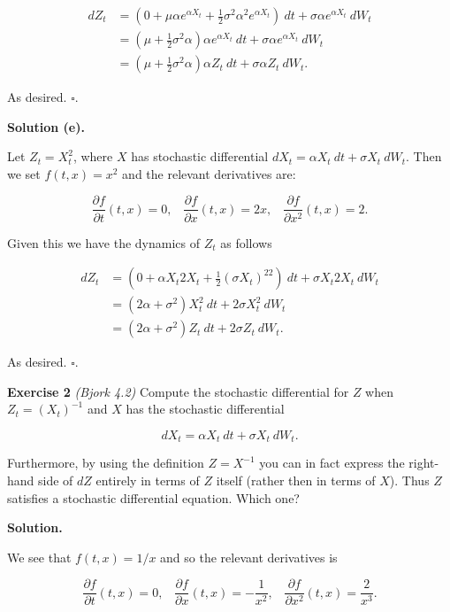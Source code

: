 \documentclass[
]{book}
\begin{document}
\begin{align*}
dZ_t&=\left(0+\mu \alpha e^{\alpha X_t}+\frac{1}{2} \sigma^2\alpha^2 e^{\alpha X_t}\right)\ dt+\sigma \alpha e^{\alpha X_t}\ dW_t\\
&=\left(\mu+\frac{1}{2}\sigma^2\alpha\right)\alpha e^{\alpha X_t}\ dt+\sigma \alpha e^{\alpha X_t}\ dW_t\\
&=\left(\mu+\frac{1}{2}\sigma^2\alpha\right)\alpha Z_t\ dt+\sigma \alpha Z_t\ dW_t.
\end{align*}

As desired. \(\square\).

\textbf{Solution (e).}

Let \(Z_t=X_t^2\), where \(X\) has stochastic differential \(dX_t=\alpha X_t\ dt+\sigma X_t\ dW_t\). Then we set \(f(t,x)=x^2\) and the relevant derivatives are:

\[
\frac{\partial f}{\partial t}(t,x)=0,\hspace{10pt}\frac{\partial f}{\partial x}(t,x) =2x,\hspace{10pt}\frac{\partial f}{\partial x^2}(t,x) =2.
\]

Given this we have the dynamics of \(Z_t\) as follows

\begin{align*}
dZ_t&=\left(0 + \alpha X_t2X_t+\frac{1}{2}(\sigma X_t)^22\right)\ dt+\sigma X_t 2 X_t\ dW_t\\
&=\left(2\alpha +\sigma^2\right) X_t^2\ dt + 2\sigma X_t^2\ dW_t\\
&=\left(2\alpha +\sigma^2\right) Z_t\ dt + 2\sigma Z_t\ dW_t.
\end{align*}

As desired. \(\square\).

\textbf{Exercise 2} \emph{(Bjork 4.2)} Compute the stochastic differential for \(Z\) when \(Z_t=(X_t)^{-1}\) and \(X\) has the stochastic differential

\[
dX_t=\alpha X_t\ dt + \sigma X_t\ dW_t.
\]

Furthermore, by using the definition \(Z=X^{-1}\) you can in fact express the right-hand side of \(dZ\) entirely in terms of \(Z\) itself (rather then in terms of \(X\)). Thus \(Z\) satisfies a stochastic differential equation. Which one?

\textbf{Solution.}

We see that \(f(t,x)=1/x\) and so the relevant derivatives is

\[
\frac{\partial f}{\partial t}(t,x)=0,\hspace{10pt}\frac{\partial f}{\partial x}(t,x) =-\frac{1}{x^2},\hspace{10pt}\frac{\partial f}{\partial x^2}(t,x) =\frac{2}{x^3}.
\]
\end{document}
